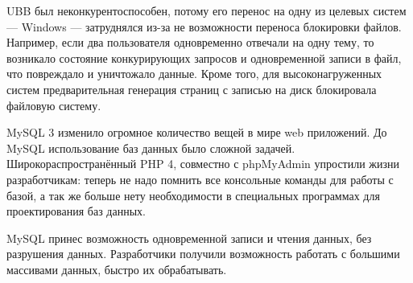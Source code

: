 UBB был неконкурентоспособен, потому его перенос на одну из целевых систем --- Windows --- затруднялся из-за не возможности переноса блокировки файлов. Например, если два пользователя одновременно отвечали на одну тему, то возникало состояние конкурирующих запросов и одновременной записи в файл, что повреждало и уничтожало данные. Кроме того, для высоконагруженных систем предварительная генерация страниц  с записью на диск блокировала файловую систему.


MySQL 3 изменило огромное количество вещей в мире web приложений. До MySQL использование баз данных было сложной задачей. Широкораспространённый PHP 4, совместно с phpMyAdmin упростили жизни разработчикам: теперь не надо помнить все консольные команды для работы с базой, а так же больше нету необходимости в специальных программах для проектирования баз данных.

MySQL принес возможность одновременной записи и чтения данных, без разрушения данных. Разработчики получили возможность работать с большими массивами данных, быстро их обрабатывать.








\clearpage